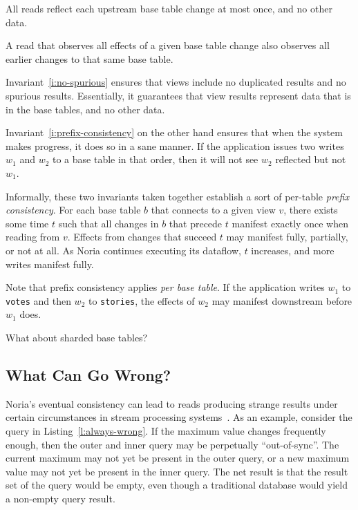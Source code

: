 \begin{invariant}
  \label{i:no-spurious}
  All reads reflect each upstream base table change at most once, and no other
  data.
\end{invariant}

\begin{invariant}
  \label{i:prefix-consistency}
  A read that observes all effects of a given base table change also observes
  all earlier changes to that same base table.
\end{invariant}

Invariant~\ref{i:no-spurious} ensures that views include no duplicated results
and no spurious results. Essentially, it guarantees that view results represent
data that is in the base tables, and no other data.

Invariant~\ref{i:prefix-consistency} on the other hand ensures that when the
system makes progress, it does so in a sane manner. If the application issues
two writes $w_1$ and $w_2$ to a base table in that order, then it will not see
$w_2$ reflected but not $w_1$.

Informally, these two invariants taken together establish a sort of per-table
\emph{prefix consistency}. For each base table $b$ that connects to a given view
$v$, there exists some time $t$ such that all changes in $b$ that precede $t$
manifest exactly once when reading from $v$. Effects from changes that succeed
$t$ may manifest fully, partially, or not at all. As Noria continues executing
its dataflow, $t$ increases, and more writes manifest fully.

Note that prefix consistency applies \emph{per base table}. If the application
writes $w_1$ to \texttt{votes} and then $w_2$ to \texttt{stories}, the effects
of $w_2$ may manifest downstream before $w_1$ does.

\begin{inprogress}
  What about sharded base tables?
\end{inprogress}

\subsection{What Can Go Wrong?}

Noria's eventual consistency can lead to reads producing strange results
under certain circumstances in stream processing
systems~\cite{materialize-eventual}. As an example, consider the query in
Listing~\vref{l:always-wrong}. If the maximum value changes frequently enough,
then the outer and inner query may be perpetually ``out-of-sync''. The current
maximum may not yet be present in the outer query, or a new maximum value may
not yet be present in the inner query. The net result is that the result set of
the query would be empty, even though a traditional database would yield a
non-empty query result.

